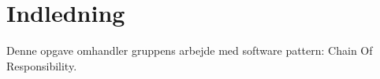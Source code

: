 \chapter{Indledning}\label{ch:introduction}
Denne opgave omhandler gruppens arbejde med software pattern: Chain Of Responsibility.
